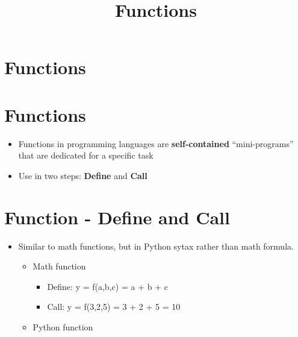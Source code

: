 \documentclass[11pt]{article}
\title{Functions}
\providecommand{\tightlist}{%
      \setlength{\itemsep}{0pt}\setlength{\parskip}{0pt}}
\begin{document}
    
    
    \maketitle
    
    

    
    \section{Functions}\label{functions}

    \section{Functions}\label{functions}

\begin{itemize}
\tightlist
\item
  Functions in programming languages are \textbf{self-contained}
  ``mini-programs'' that are dedicated for a specific task
\item
  Use in two steps: \textbf{Define} and \textbf{Call}
\end{itemize}

    \section{Function - Define and Call}\label{function---define-and-call}

\begin{itemize}
\tightlist
\item
  Similar to math functions, but in Python sytax rather than math
  formula.

  \begin{itemize}
  \tightlist
  \item
    Math function

    \begin{itemize}
    \tightlist
    \item
      Define: y = f(a,b,c) = a + b + c
    \item
      Call: y = f(3,2,5) = 3 + 2 + 5 = 10
    \end{itemize}
  \item
    Python function
  \end{itemize}
\end{itemize}
\end{document}
